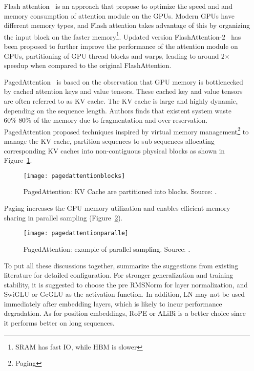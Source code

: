 Flash attention~\cite{dao2022flashattention} is an approach that propose to optimize the speed and and memory consumption of attention module on the GPUs.
Modern GPUs have different memory types, and Flash attention takes advantage of this by organizing the input block on the faster memory\footnote{SRAM has fast IO, while HBM is slower}.
Updated version FlashAttention-2~\cite{liu2022fast} has been proposed to further improve the performance of the attention module on GPUs, partitioning of GPU thread blocks and warps, leading to around 2× speedup when compared to the original FlashAttention.

PagedAttention~\cite{vllm2023} is based on the observation that GPU memory is bottlenecked by cached attention keys and value tensors.
These cached key and value tensors are often referred to as KV cache.
The KV cache is large and highly dynamic, depending on the sequence length.
Authors finds that existent system waste 60\%-80\% of the memory due to fragmentation and over-reservation.
PagedAttention proposed techniques inspired by virtual memory management\footnote{Paging} to manage the KV cache, partition sequences to sub-sequences allocating corresponding KV caches into non-contiguous physical blocks as shown in Figure~\ref{fig:paging}.

\begin{figure}[h]
	\centering
	\texttt{[image: pagedattentionblocks]}
	\caption{PagedAttention: KV Cache are partitioned into blocks. Source: \textcite{vllm2023}.}
	\label{fig:paging}
\end{figure}

Paging increases the GPU memory utilization and enables efficient memory sharing in parallel sampling (Figure~\ref{fig:paging-parallel}).

\begin{figure}[h]
	\centering
	\texttt{[image: pagedattentionparalle]}
	\caption{PagedAttention: example of parallel sampling. Source: \textcite{vllm2023}.}
	\label{fig:paging-parallel}
\end{figure}

To put all these discussions together, \textcite{survey} summarize the suggestions from existing literature for detailed configuration.
For stronger generalization and training stability, it is suggested to choose the pre RMSNorm for layer normalization, and SwiGLU or GeGLU as the activation function.
In addition, LN may not be used immediately after embedding layers, which is likely to incur performance degradation.
As for position embeddings, RoPE or ALiBi is a better choice since it performs better on long sequences.

